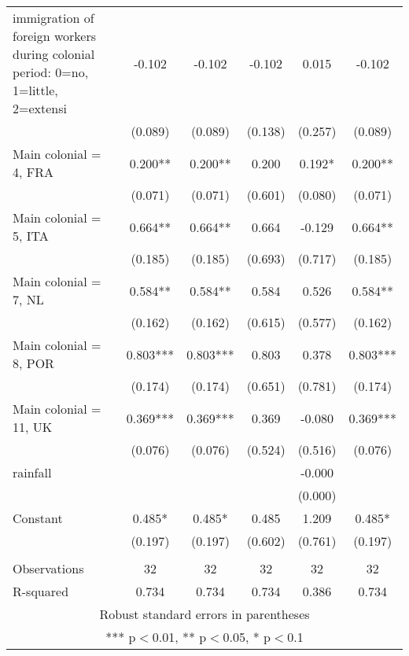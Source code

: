 \documentclass[]{article}
\begin{document}
\begin{tabular}{lccccc}
immigration of foreign workers during colonial period: 0=no, 1=little, 2=extensi & -0.102 & -0.102 & -0.102 & 0.015 & -0.102 \\
 & (0.089) & (0.089) & (0.138) & (0.257) & (0.089) \\
Main colonial = 4, FRA & 0.200** & 0.200** & 0.200 & 0.192* & 0.200** \\
 & (0.071) & (0.071) & (0.601) & (0.080) & (0.071) \\
Main colonial = 5, ITA & 0.664** & 0.664** & 0.664 & -0.129 & 0.664** \\
 & (0.185) & (0.185) & (0.693) & (0.717) & (0.185) \\
Main colonial = 7, NL & 0.584** & 0.584** & 0.584 & 0.526 & 0.584** \\
 & (0.162) & (0.162) & (0.615) & (0.577) & (0.162) \\
Main colonial = 8, POR & 0.803*** & 0.803*** & 0.803 & 0.378 & 0.803*** \\
 & (0.174) & (0.174) & (0.651) & (0.781) & (0.174) \\
Main colonial = 11, UK & 0.369*** & 0.369*** & 0.369 & -0.080 & 0.369*** \\
 & (0.076) & (0.076) & (0.524) & (0.516) & (0.076) \\
rainfall &  &  &  & -0.000 &  \\
 &  &  &  & (0.000) &  \\
Constant & 0.485* & 0.485* & 0.485 & 1.209 & 0.485* \\
 & (0.197) & (0.197) & (0.602) & (0.761) & (0.197) \\
 &  &  &  &  &  \\
Observations & 32 & 32 & 32 & 32 & 32 \\
 R-squared & 0.734 & 0.734 & 0.734 & 0.386 & 0.734 \\ \hline
\multicolumn{6}{c}{ Robust standard errors in parentheses} \\
\multicolumn{6}{c}{ *** p$<$0.01, ** p$<$0.05, * p$<$0.1} \\
\end{tabular}
\end{document}
